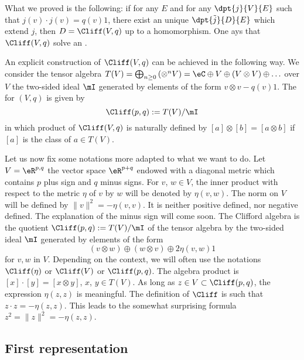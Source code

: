 What we proved is the following: if for any $E$ and for any $\dpt{j}{V}{E}$ such that $j(v)\cdot j(v)=q(v)1$, there exist an unique $\dpt{\tilde{j}}{D}{E}$ which extend $j$, then $D=\Cliff(V,q)$ up to a homomorphism. One ays that $\Cliff(V,q)$ solve an .

An explicit construction of $\Cliff(V,q)$ can be achieved in the following way. We consider the tensor algebra $T(V)=\bigoplus_{n\geq 0}\left(\otimes^nV\right)=\eC\oplus V\oplus(V\otimes V)\oplus\ldots$ over $V$ the two-sided ideal $\mI$ generated by elements of the form $v\otimes v-q(v)1$. The   for $(V,q)$ is given by
\begin{equation}	\label{defI}
	\Cliff(p,q):=T(V)/\mI
\end{equation}
in which product of $\Cliff(V,q)$ is naturally defined by $[a]\otimes[b]=[a\otimes b]$ if $[a]$ is the class of $a\in T(V)$.

Let us now fix some notations more adapted to what we want to do. Let $V=\eR^{p,q}$ the vector space $\eR^{p+q}$ endowed with a diagonal metric which contains $p$ plus sign and $q$ minus signs. For $v$, $w\in V$, the inner product with respect to the metric $\eta$ of $v$ by $w$ will be denoted by $\eta(v,w)$.  The norm on $V$ will be defined by $\|v\|^2=-\eta(v,v)$. It is neither positive defined, nor negative defined. The explanation of the minus sign will come soon. The Clifford algebra is the quotient $\Cliff(p,q):=T(V)/\mI$ of the tensor algebra by the two-sided ideal $\mI$ generated by elements of the form
\[
	(v\otimes w)\oplus (w\otimes v)\oplus 2\eta(v,w)1
\]
 for $v,w$ in $V$. Depending on the context, we will often use the notations $\Cliff(\eta)$ or $\Cliff(V)$ or $\Cliff(p,q)$. The algebra product is $[x]\cdot[y]=[x\otimes y]$, $x$, $y\in T(V)$.  As long as $z\in V\subset\Cliff(p,q)$, the expression $\eta(z,z)$ is meaningful. The definition of $\Cliff$ is such that $z\cdot z=-\eta(z,z)$. This leads to the somewhat surprising formula  $z^2=\|z\|^2=-\eta(z,z)$.

\subsection{First representation}

